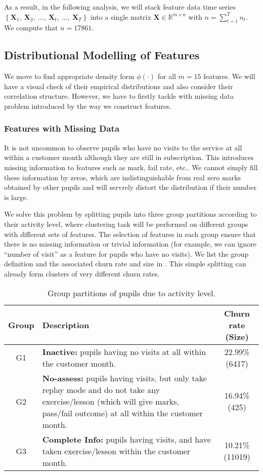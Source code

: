 As a result, in the following analysis, we will stack feature data time series $\left\lbrace \mathbf{X}_1, ~\mathbf{X}_2, ~\dots, ~\mathbf{X}_t, ~\dots, ~\mathbf{X}_T \right\rbrace$ into a single matrix $\mathbf{X} \in \mathbb{R}^{m \times n}$ with $n = \sum_{t=1}^{T} n_t$. We compute that $n=17861$.

\subsection{Distributional Modelling of Features}

We move to find appropriate density form $\phi(\cdot)$ for all $m=15$ features. We will have a visual check of their empirical distributions and also consider their correlation structure. However, we have to firstly tackle with missing data problem introduced by the way we construct features.

\subsubsection{Features with Missing Data}

It is not uncommon to observe pupils who have no visits to the service at all within a customer month although they are still in subscription. This introduces missing information to features such as mark, fail rate, etc.. We cannot simply fill these information by zeros, which are indistinguishable from real zero marks obtained by other pupils and will servrely distort the distribution if their number is large. 

We solve this problem by splitting pupils into three group partitions according to their activity level, where clustering task will be performed on different groups with different sets of features. The selection of features in each group ensure that there is no missing information or trivial information (for example, we can ignore ``number of visit'' as a feature for pupils who have no visits). We list the group definition and the associated churn rate and size in . This simple splitting can already form clusters of very different churn rates. 

\begin{table}[!h]
\centering
\footnotesize
\begin{tabular}{c|p{9cm}|c}
\hline
\textbf{Group} & \textbf{Description} & \textbf{Churn rate (Size)}\\
\hline
G1 &
\textbf{Inactive:} pupils having no visits at all within the customer month. &
22.99\% (6417) \\
\hline
G2 &
\textbf{No-assess:} pupils having visits, but only take replay mode and do not take any exercise/lesson (which will give marks, pass/fail outcome) at all within the customer month. &
16.94\% (425) \\
\hline
G3 &
\textbf{Complete Info:} pupils having visits, and have taken exercise/lesson within the customer month. &
10.21\% (11019) \\
\hline
\end{tabular}
\caption{Group partitions of pupils due to activity level.}
\label{tab:G123}
\end{table}

